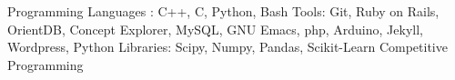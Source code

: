 \begin{cvhonors}
  \cvhonor
      {Programming Languages : C++, C, Python, Bash}
    {}
    {}
    {}
      \cvhonor
      {Tools: Git, Ruby on Rails, OrientDB, Concept Explorer, MySQL, GNU Emacs, php, Arduino, Jekyll, Wordpress, Python Libraries: Scipy, Numpy, Pandas, Scikit-Learn }
    {}
    {}
    {}
          \cvhonor
      {Competitive Programming }
    {}
    {}
    {}

\end{cvhonors}
